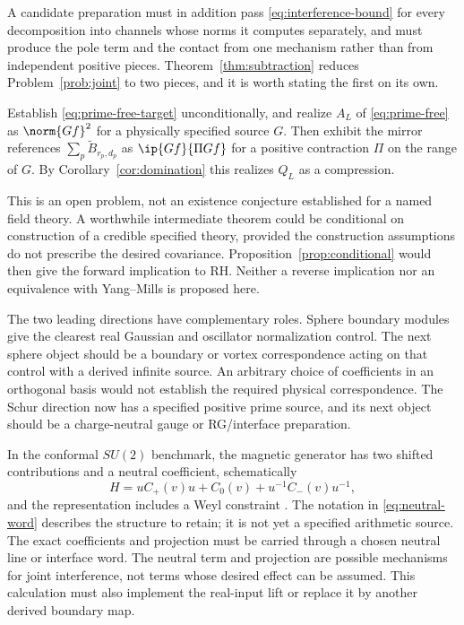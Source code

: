 A candidate preparation must in addition pass
\eqref{eq:interference-bound} for every decomposition into channels whose
norms it computes separately, and must produce the pole term and the
contact from one mechanism rather than from independent positive pieces.
Theorem~\ref{thm:subtraction} reduces Problem~\ref{prob:joint} to two
pieces, and it is worth stating the first on its own.

\begin{problem}\label{prob:subtraction}
Establish \eqref{eq:prime-free-target} unconditionally, and realize
$A_L$ of \eqref{eq:prime-free} as $\norm{Gf}^2$ for a physically specified
source $G$. Then exhibit the mirror references
$\sum_p\widetilde B_{r_p,d_p}$ as $\ip{Gf}{\Pi Gf}$ for a positive
contraction $\Pi$ on the range of $G$. By
Corollary~\ref{cor:domination} this realizes $Q_L$ as a compression.
\end{problem}

This is an open problem, not an existence conjecture established for
a named field theory. A worthwhile intermediate theorem could be
conditional on construction of a credible specified theory, provided
the construction assumptions do not prescribe the desired covariance.
Proposition~\ref{prop:conditional} would then give the forward
implication to RH. Neither a reverse implication nor an equivalence
with Yang--Mills is proposed here.

The two leading directions have complementary roles. Sphere boundary
modules give the clearest real Gaussian and oscillator normalization
control. The next sphere object should be a boundary or vortex
correspondence acting on that control with a derived infinite source.
An arbitrary choice of coefficients in an orthogonal basis would not
establish the required physical correspondence. The Schur direction
now has a specified positive prime source, and its next object should
be a charge-neutral gauge or RG/interface preparation.

In the conformal $SU(2)$ benchmark, the magnetic generator has two
shifted contributions and a neutral coefficient, schematically
\begin{equation}\label{eq:neutral-word}
 H=uC_+(v)u+C_0(v)+u^{-1}C_-(v)u^{-1},
\end{equation}
and the representation includes a Weyl constraint
\cite[Sections 5.1.2--5.1.3]{Schur}. The notation in
\eqref{eq:neutral-word} describes the structure to retain; it is not
yet a specified arithmetic source. The exact coefficients and projection
must be carried through a chosen neutral line or interface word. The
neutral term and projection are possible mechanisms for joint
interference, not terms whose desired effect can be assumed. This
calculation must also implement the real-input lift or replace it by
another derived boundary map.

